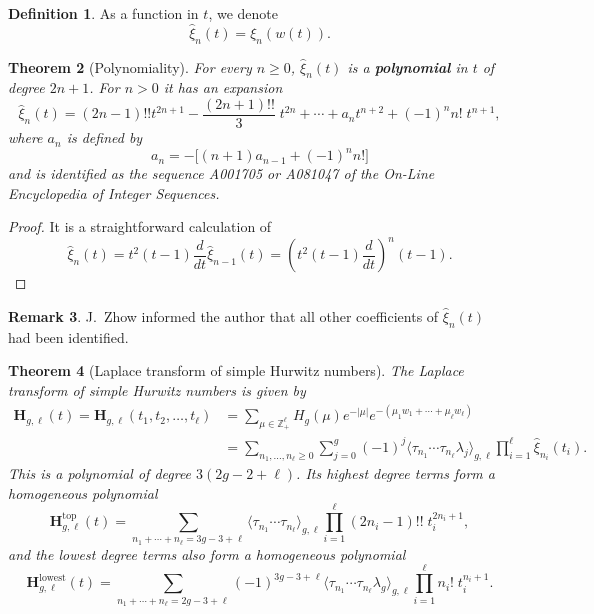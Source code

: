 \documentclass{amsart}
\newtheorem{thm}{Theorem}[section]
\theoremstyle{definition}
\newtheorem{Def}[thm]{Definition}
\newtheorem{rem}[thm]{Remark}
\numberwithin{equation}{section}
\numberwithin{figure}{section}
\newcommand{\bZ}{{\mathbb{Z}}}
\newcommand{\la}{{\langle}}
\newcommand{\ra}{{\rangle}}
\newcommand{\hxi}{{\hat{\xi}}}
\begin{document}
\begin{Def}
As a function in $t$, we denote 
\begin{equation}
\label{eq:xihat}
\hxi_n(t) = \xi_n(w(t)).
\end{equation}
\end{Def}

\begin{thm}[Polynomiality]
For every $n\ge 0$, 
$\hxi_n(t)$ is a \textbf{polynomial} in $t$ of degree
$2n+1$. For $n>0$ it has an expansion 
\begin{equation}
\label{eq:hxi-expansion}
\hxi_n(t)=
(2n-1)!! t^{2n+1} - \frac{(2n+1)!!}{3}\; t^{2n}+\cdots
+a_n t^{n+2} + (-1)^n n! \;t^{n+1},
\end{equation}
where $a_n$ is defined by
$$
a_{n} =-\big[(n+1)a_{n-1} +(-1)^n n!\big]
$$
and is identified as the sequence A001705 or A081047 of the
\emph{On-Line Encyclopedia of Integer Sequences}.
\end{thm}

\begin{proof}
It is a straightforward calculation of
$$
\hxi_n(t) = t^2(t-1)\frac{d}{dt}\hxi_{n-1}(t)
=\left(t^2(t-1)\frac{d}{dt}\right)^n (t-1).
$$
\end{proof}


\begin{rem} J.~Zhow informed the author that all other coefficients of
$\hxi_n(t)$
 had been identified.


\end{rem}

\begin{thm}[Laplace transform of simple Hurwitz
numbers]
The Laplace transform of simple Hurwitz numbers
is given by
\begin{equation}
\begin{aligned}
\label{eq:LTofHgmu}
\mathbf{H}_{g,\ell}(t) = \mathbf{H}_{g,\ell}(t_1,t_2,\dots,t_\ell) &=
\sum_{\mu\in\bZ_+ ^\ell}
H_g(\mu) e^{-|\mu|}e^{-(\mu_1w_1+\cdots+\mu_\ell
w_\ell)}
\\
&=
\sum_{n_1,\dots,n_\ell \ge 0}
\sum_{j=0} ^g (-1)^j
\la \tau_{n_1}\cdots \tau_{n_\ell}\lambda_j\ra_{g,\ell}
\prod_{i=1} ^\ell \hxi_{n_i}(t_i).
\end{aligned}
\end{equation}
This is a polynomial of degree
$3(2g-2+\ell)$. Its highest degree terms form a
homogeneous polynomial
\begin{equation}
\label{eq:Fgltop}
\mathbf{H}_{g,\ell} ^{\text{top}}(t)
=
\sum_{n_1+\cdots+n_\ell =3g-3+\ell}
\la \tau_{n_1}\cdots \tau_{n_\ell}\ra_{g,\ell}
\prod_{i=1} ^\ell (2n_i-1)!!\;t_i ^{2n_i+1},
\end{equation}
and the lowest degree terms also form  a
homogeneous polynomial
\begin{equation}
\label{Fgllow}
\mathbf{H}_{g,\ell} ^{\text{lowest}}(t) 
=
\sum_{n_1+\cdots+n_\ell =2g-3+\ell}
(-1)^{3g-3+\ell}
\la \tau_{n_1}\cdots \tau_{n_\ell}\lambda_g\ra_{g,\ell}
\prod_{i=1} ^\ell n_i !\; t_i ^{n_i+1}.
\end{equation}
\end{thm}
\end{document}

